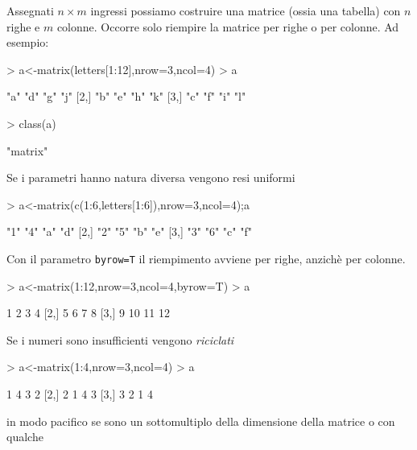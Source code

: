 \documentclass[onecolumn,12pt]{book}
\begin{document}
Assegnati $n\times m$ ingressi possiamo costruire una matrice (ossia una tabella) con $n$ righe e $m$ colonne. Occorre solo riempire la matrice per righe o per colonne.
Ad esempio:
\begin{Schunk}
\begin{Sinput}
> a<-matrix(letters[1:12],nrow=3,ncol=4)
> a
\end{Sinput}
\begin{Soutput}
     [,1] [,2] [,3] [,4]
[1,] "a"  "d"  "g"  "j" 
[2,] "b"  "e"  "h"  "k" 
[3,] "c"  "f"  "i"  "l" 
\end{Soutput}
\begin{Sinput}
> class(a)
\end{Sinput}
\begin{Soutput}
[1] "matrix"
\end{Soutput}
\end{Schunk}
Se i parametri hanno natura diversa vengono resi uniformi
\begin{Schunk}
\begin{Sinput}
> a<-matrix(c(1:6,letters[1:6]),nrow=3,ncol=4);a
\end{Sinput}
\begin{Soutput}
     [,1] [,2] [,3] [,4]
[1,] "1"  "4"  "a"  "d" 
[2,] "2"  "5"  "b"  "e" 
[3,] "3"  "6"  "c"  "f" 
\end{Soutput}
\end{Schunk}
Con il parametro \texttt{byrow=T} il riempimento avviene per righe, anzich\`e per colonne.
\begin{Schunk}
\begin{Sinput}
>  a<-matrix(1:12,nrow=3,ncol=4,byrow=T)
>  a
\end{Sinput}
\begin{Soutput}
     [,1] [,2] [,3] [,4]
[1,]    1    2    3    4
[2,]    5    6    7    8
[3,]    9   10   11   12
\end{Soutput}
\end{Schunk}
Se i numeri sono insufficienti vengono \emph {riciclati}
\begin{Schunk}
\begin{Sinput}
> a<-matrix(1:4,nrow=3,ncol=4)
> a
\end{Sinput}
\begin{Soutput}
     [,1] [,2] [,3] [,4]
[1,]    1    4    3    2
[2,]    2    1    4    3
[3,]    3    2    1    4
\end{Soutput}
\end{Schunk}
in modo pacifico se sono un sottomultiplo della dimensione della matrice o con qualche
\end{document}
